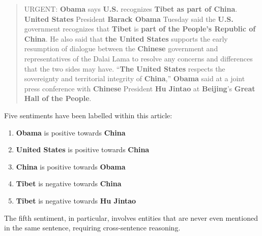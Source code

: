\documentclass[11pt,a4paper]{article}
\begin{document}
\begin{quote}
URGENT: \textcolor[rgb]{1, 0.5, 0}{\textbf{Obama}} says \textcolor[rgb]{0, 0, 1}{\textbf{U.S.}} recognizes \textcolor[rgb]{0, 0.5, 0}{\textbf{\textcolor[rgb]{0, 0.5, 0}{\textbf{Tibet}} as part of \textcolor[rgb]{1, 0, 0}{\textbf{China}}}}. \textcolor[rgb]{0, 0, 1}{\textbf{United States}} President \textcolor[rgb]{1, 0.5, 0}{\textbf{Barack Obama}} Tuesday said the \textcolor[rgb]{0, 0, 1}{\textbf{U.S.}} government recognizes that \textcolor[rgb]{0, 0.5, 0}{\textbf{Tibet}} is \textcolor[rgb]{0, 0.5, 0}{\textbf{part of the \textcolor[rgb]{1, 0, 0}{\textbf{People's Republic of China}}}}. He also said that \textcolor[rgb]{0, 0, 1}{\textbf{the \textcolor[rgb]{0, 0, 1}{\textbf{United States}}}} supports the early resumption of dialogue between the \textcolor[rgb]{1, 0, 0}{\textbf{Chinese}} government and representatives of the Dalai Lama to resolve any concerns and differences that the two sides may have. ``\textcolor[rgb]{0, 0, 1}{\textbf{The \textcolor[rgb]{0, 0, 1}{\textbf{United States}}}} respects the sovereignty and territorial integrity of \textcolor[rgb]{1, 0, 0}{\textbf{China}},'' \textcolor[rgb]{1, 0.5, 0}{\textbf{Obama}} said at a joint press conference with \textcolor[rgb]{1, 0, 0}{\textbf{Chinese}} President \textcolor[rgb]{0.4, 0.25, 0.13}{\textbf{Hu Jintao}} at \textcolor[rgb]{1, 1, 0}{\textbf{Beijing}}'s \textcolor[rgb]{1, 0, 1}{\textbf{Great Hall of the People}}.
\end{quote}
Five sentiments have been labelled within this article:
\begin{enumerate}
\item \textcolor[rgb]{1, 0.5, 0}{\textbf{Obama}} is \textcolor[rgb]{0, 0.5, 0}{positive} towards \textcolor[rgb]{1, 0, 0}{\textbf{China}}
\item \textcolor[rgb]{0, 0, 1}{\textbf{United States}} is \textcolor[rgb]{0, 0.5, 0}{positive} towards \textcolor[rgb]{1, 0, 0}{\textbf{China}}
\item \textcolor[rgb]{1, 0, 0}{\textbf{China}} is \textcolor[rgb]{0, 0.5, 0}{positive} towards \textcolor[rgb]{1, 0.5, 0}{\textbf{Obama}}
\item \textcolor[rgb]{0, 0.5, 0}{\textbf{Tibet}} is \textcolor[rgb]{1, 0, 0}{negative} towards \textcolor[rgb]{1, 0, 0}{\textbf{China}}
\item \textcolor[rgb]{0, 0.5, 0}{\textbf{Tibet}} is \textcolor[rgb]{1, 0, 0}{negative} towards \textcolor[rgb]{0.4, 0.25, 0.13}{\textbf{Hu Jintao}}
\end{enumerate}
The fifth sentiment, in particular, involves entities that are never even mentioned in the same sentence, requiring cross-sentence reasoning.
\end{document}
